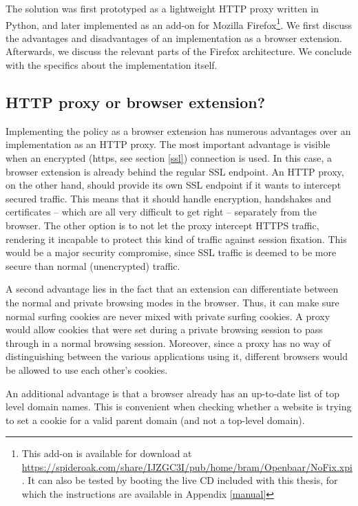 The solution was first prototyped as a lightweight HTTP proxy written in Python, and later implemented as an add-on for Mozilla Firefox\footnote{This add-on is available for download at \url{https://spideroak.com/share/IJZGC3I/pub/home/bram/Openbaar/NoFix.xpi}. It can also be tested by booting the live CD included with this thesis, for which the instructions are available in Appendix \ref{manual}}. We first discuss the advantages and disadvantages of an implementation as a browser extension. Afterwards, we discuss the relevant parts of the Firefox architecture. We conclude with the specifics about the implementation itself.

\subsection{HTTP proxy or browser extension?}\label{proxy-or-extension}

Implementing the policy as a browser extension has numerous advantages over an implementation as an HTTP proxy. The most important advantage is visible when an encrypted (\gls{https}, see section \ref{ssl}) connection is used. In this case, a browser extension is already behind the regular SSL endpoint. An HTTP proxy, on the other hand, should provide its own SSL endpoint if it wants to intercept secured traffic. This means that it should handle encryption, handshakes and certificates -- which are all very difficult to get right -- separately from the browser. The other option is to not let the proxy intercept HTTPS traffic, rendering it incapable to protect this kind of traffic against session fixation. This would be a major security compromise, since SSL traffic is deemed to be more secure than normal (unencrypted) traffic.

A second advantage lies in the fact that an extension can differentiate between the normal and private browsing modes in the browser. Thus, it can make sure normal surfing cookies are never mixed with private surfing cookies. A proxy would allow cookies that were set during a private browsing session to pass through in a normal browsing session. Moreover, since a proxy has no way of distinguishing between the various applications using it, different browsers would be allowed to use each other's cookies.

An additional advantage is that a browser already has an up-to-date list of top level domain names. This is convenient when checking whether a website is trying to set a cookie for a valid parent domain (and not a top-level domain).

